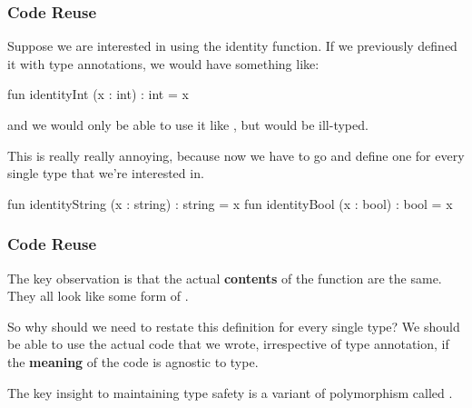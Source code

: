\documentclass[aspectratio=169]{beamer}
\begin{document}
\begin{frame}[fragile]
  \frametitle{Code Reuse}

  Suppose we are interested in using the identity function. If we previously
  defined it with type annotations, we would have something like:

  \pause
  \vspace{\fill}

  \begin{codeblock}
    fun identityInt (x : int) : int = x
  \end{codeblock}

  and we would only be able to use it like , but
   would be ill-typed.

  \pause
  \vspace{\fill}

  This is really really annoying, because now we have to go and define one for
  every single type that we're interested in.

  \pause
  \begin{codeblock}
    fun identityString (x : string) : string = x
    fun identityBool   (x : bool)   : bool   = x
  \end{codeblock}
\end{frame}

\begin{frame}[fragile]
  \frametitle{Code Reuse}

  The key observation is that the actual \textbf{contents} of the function
  are the same. They all look like some form of .

  \pause
  \vspace{\fill}

  So why should we need to restate this definition for every single type? We
  should be able to use the actual code that we wrote, irrespective of
  type annotation, if the \textbf{meaning} of the code is agnostic to type.

  \pause
  \vspace{\fill}

  The key insight to maintaining type safety is a variant of polymorphism called
  .
\end{frame}
\end{document}
